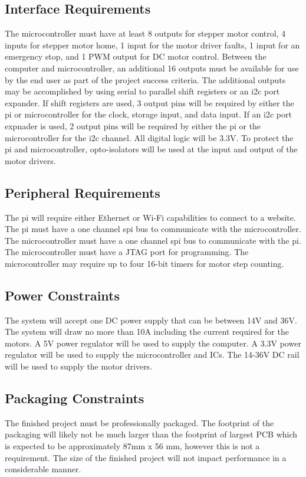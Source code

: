 \subsection{Interface Requirements}
The microcontroller must have at least 8 outputs for stepper motor control, 4 inputs for stepper motor home, 1 input for the motor driver faults, 1 input for an emergency stop, and 1 PWM output for DC motor control.
Between the computer and microcontroller, an additional 16 outputs must be available for use by the end user as part of the project success criteria.
The additional outputs may be accomplished by using serial to parallel shift registers or an \gls{i2c} port expander.
If shift registers are used, 3 output pins will be required by either the pi or microcontroller for the clock, storage input, and data input.
If an \gls{i2c} port expnader is used, 2 output pins will be required by either the \gls{pi} or the microcontroller for the \gls{i2c} channel.
All digital logic will be 3.3V.
To protect the \gls{pi} and microcontroller, opto-isolators will be used at the input and output of the motor drivers.

\subsection{Peripheral Requirements}
The \gls{pi} will require either Ethernet or Wi-Fi capabilities to connect to a website.
The \gls{pi} must have a one channel \gls{spi} bus to communicate with the microcontroller. 
The microcontroller must have a one channel \gls{spi} bus to communicate with the \gls{pi}.
The microcontroller must have a JTAG port for programming.
The microcontroller may require up to four 16-bit timers for motor step counting.

\subsection{Power Constraints}
The system will accept one DC power supply that can be between 14V and 36V.
The system will draw no more than 10A including the current required for the motors.
A 5V power regulator will be used to supply the computer.
A 3.3V power regulator will be used to supply the microcontroller and ICs.
The 14-36V DC rail will be used to supply the motor drivers. 

\subsection{Packaging Constraints}
The finished project must be professionally packaged.
The footprint of the packaging will likely not be much larger than the footprint of largest PCB which is expected to be approximately 87mm x 56 mm, however this is not a requirement.
The size of the finished project will not impact performance in a considerable manner.

